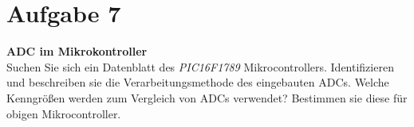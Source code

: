\documentclass[12pt,a4paper,ngerman]{article}
\begin{document}
\pagebreak

\section{Aufgabe 7}
\begin{framed}
\textbf{ADC im Mikrokontroller} \\
Suchen Sie sich ein Datenblatt des \textit{PIC16F1789} Mikrocontrollers. Identifizieren und beschreiben sie die Verarbeitungsmethode des eingebauten ADCs. Welche Kenngrößen werden zum Vergleich von ADCs verwendet? Bestimmen sie diese für obigen Mikrocontroller. 
\end{framed}   
   
   
   
\end{document}
